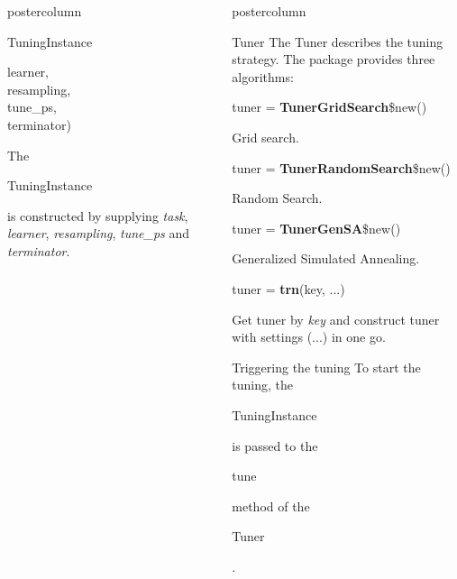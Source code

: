 \documentclass{beamer}
\newlength{\columnheight} %
\newcommand{\codeinline}[1]{\begin{codeboxinline}#1\end{codeboxinline}}
\begin{document}
\begin{frame}[fragile]{}
\begin{columns}
\begin{column}{.245\textwidth}
\begin{beamercolorbox}[center]{postercolumn}
\begin{minipage}{.98\textwidth}
{\begin{myblock}{TuningInstance}
\begin{codeboxmultiline}[width=18cm]
						\hspace*{1ex}learner,\\
						\hspace*{1ex}resampling,\\
						\hspace*{1ex}tune\_ps,\\
						\hspace*{1ex}terminator)
					\end{codeboxmultiline}
					The \codeinline{TuningInstance} is constructed by supplying \textit{task}, \textit{learner}, \textit{resampling}, \textit{tune\_ps} and \textit{terminator}. 
					\\
				\end{myblock}	
					\vfill}
				\end{minipage}
			\end{beamercolorbox}
		\end{column}
		\begin{column}{.245\textwidth}
			\begin{beamercolorbox}[center]{postercolumn}
				\begin{minipage}{.98\textwidth}
					\parbox[t][\columnheight]{\textwidth}{
						\begin{myblock}{Tuner}
							The Tuner describes the tuning strategy. The package provides three algorithms:
							\\
							\begin{codebox}
								tuner = \textbf{TunerGridSearch}\$new()
							\end{codebox}
							Grid search.
							\\
							\begin{codebox}
								tuner = \textbf{TunerRandomSearch}\$new()
							\end{codebox}
							Random Search.
							\\
							\begin{codebox}
								tuner = \textbf{TunerGenSA}\$new()
							\end{codebox}
							Generalized Simulated Annealing.
							\\
							\begin{codebox}
								tuner = \textbf{trn}(key, ...)
							\end{codebox}
							Get tuner by \textit{key} and construct tuner with settings (...) in one go.
						\end{myblock}
						\begin{myblock}{Triggering the tuning}
							To start the tuning, the \codeinline{TuningInstance} is passed to the \codeinline{tune} method of the \codeinline{Tuner}.

\end{myblock}}
\end{minipage}
\end{beamercolorbox}
\end{column}
\end{columns}
\end{frame}
\end{document}
